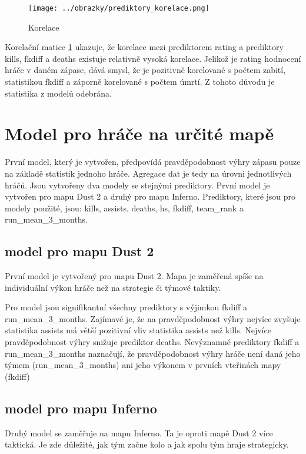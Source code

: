 \begin{figure}[H]
    \centering
    \texttt{[image: ../obrazky/prediktory\_korelace.png]}
    \caption{Korelace} 
    \label{fig:korelacni_matice}
\end{figure}

Korelační matice \ref{fig:korelacni_matice} ukazuje, že korelace mezi prediktorem rating a prediktory kills, fkdiff a deaths existuje relativně vysoká korelace.
Jelikož je rating hodnocení hráče v daném zápase, dává smysl, že je pozitivně korelované s počtem zabití, statistikou fkdiff a záporně korelované s počtem úmrtí.
Z tohoto důvodu je statistika z modelů odebrána.

\newpage
\section{Model pro hráče na určité mapě}
První model, který je vytvořen, předpovídá pravděpodobnost výhry zápasu pouze na základě statistik jednoho hráče. Agregace dat je tedy na úrovni jednotlivých hráčů.
Jsou vytvořeny dva modely se stejnými prediktory. První model je vytvořen pro mapu Dust 2 a druhý pro mapu Inferno. Prediktory, které jsou pro modely použité, jsou:
kills, assists, deaths, hs, fkdiff, team\_rank a run\_mean\_3\_months.

\subsection{model pro mapu Dust 2}
První model je vytvořený pro mapu Dust 2. Mapa je zaměřená spíše na individuální výkon hráče než na strategie či týmové taktiky.


Pro model jsou signifikantní všechny prediktory s výjimkou fkdiff a run\_mean\_3\_months. Zajímavé je, že na pravděpodobnost výhry nejvíce zvyšuje statistika assists
má větší pozitivní vliv statistika assists než kills. Nejvíce pravděpodobnost výhry snižuje prediktor deaths. Nevýznamné prediktory fkdiff a run\_mean\_3\_months naznačují,
že pravděpodobnost výhry hráče není daná jeho týmem (run\_mean\_3\_months) ani jeho výkonem v prvních vteřinách mapy (fkdiff) 

\subsection{model pro mapu Inferno} \label{sec:model_pro_mapu_inferno}
Druhý model se zaměřuje na mapu Inferno. Ta je oproti mapě Dust 2 více taktická. Je zde důležité, jak tým začne kolo a jak spolu tým hraje strategicky.


